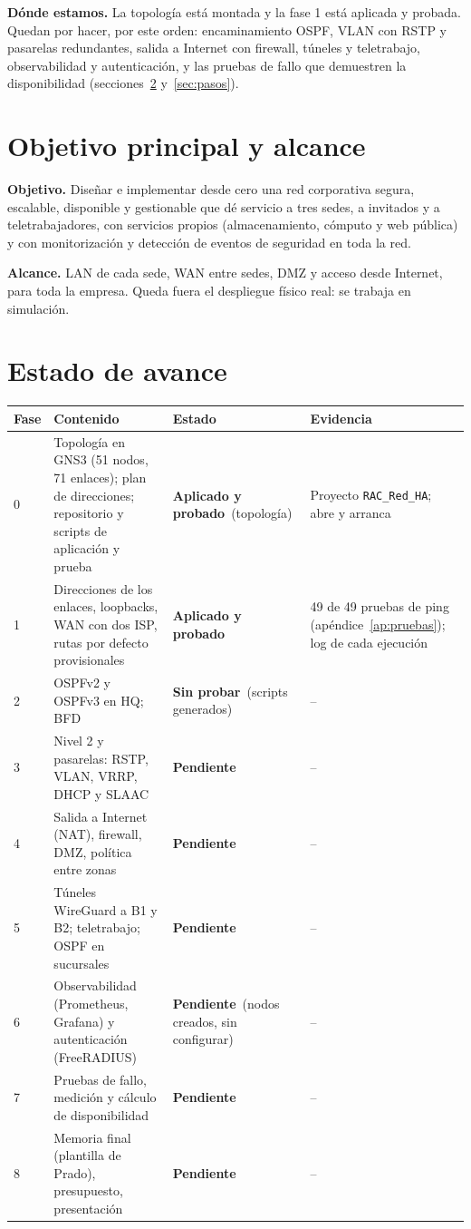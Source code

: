 \documentclass[11pt,a4paper]{article}
\newcommand{\cod}[1]{\texttt{#1}}
\newcommand{\ok}{\textcolor{verde}{\textbf{Aplicado y probado}}}
\newcommand{\pen}{\textcolor{rojo}{\textbf{Pendiente}}}
\newcommand{\sinp}{\textcolor{naranja}{\textbf{Sin probar}}}
\begin{document}
\textbf{Dónde estamos.} La topología está montada y la fase 1 está aplicada y probada. Quedan por hacer, por este orden: encaminamiento OSPF, VLAN con RSTP y pasarelas redundantes, salida a Internet con firewall, túneles y teletrabajo, observabilidad y autenticación, y las pruebas de fallo que demuestren la disponibilidad (secciones~\ref{sec:estado} y~\ref{sec:pasos}).

\section{Objetivo principal y alcance}
\textbf{Objetivo.} Diseñar e implementar desde cero una red corporativa segura, escalable, disponible y gestionable que dé servicio a tres sedes, a invitados y a teletrabajadores, con servicios propios (almacenamiento, cómputo y web pública) y con monitorización y detección de eventos de seguridad en toda la red.

\textbf{Alcance.} LAN de cada sede, WAN entre sedes, DMZ y acceso desde Internet, para toda la empresa. Queda fuera el despliegue físico real: se trabaja en simulación.

\section{Estado de avance}\label{sec:estado}
\begingroup\footnotesize
\begin{longtable}{@{}p{0.9cm}p{6.6cm}p{2.9cm}p{6.1cm}@{}}
\toprule
\textbf{Fase} & \textbf{Contenido} & \textbf{Estado} & \textbf{Evidencia}\\
\midrule
\endhead
0 & Topología en GNS3 (51 nodos, 71 enlaces); plan de direcciones; repositorio y scripts de aplicación y prueba & \ok\ (topología) & Proyecto \cod{RAC\_Red\_HA}; abre y arranca\\
1 & Direcciones de los enlaces, loopbacks, WAN con dos ISP, rutas por defecto provisionales & \ok & 49 de 49 pruebas de ping (apéndice~\ref{ap:pruebas}); log de cada ejecución\\
2 & OSPFv2 y OSPFv3 en HQ; BFD & \sinp\ (scripts generados) & --\\
3 & Nivel 2 y pasarelas: RSTP, VLAN, VRRP, DHCP y SLAAC & \pen & --\\
4 & Salida a Internet (NAT), firewall, DMZ, política entre zonas & \pen & --\\
5 & Túneles WireGuard a B1 y B2; teletrabajo; OSPF en sucursales & \pen & --\\
6 & Observabilidad (Prometheus, Grafana) y autenticación (FreeRADIUS) & \pen\ (nodos creados, sin configurar) & --\\
7 & Pruebas de fallo, medición y cálculo de disponibilidad & \pen & --\\
8 & Memoria final (plantilla de Prado), presupuesto, presentación & \pen & --\\
\bottomrule
\end{longtable}
\endgroup
\end{document}
